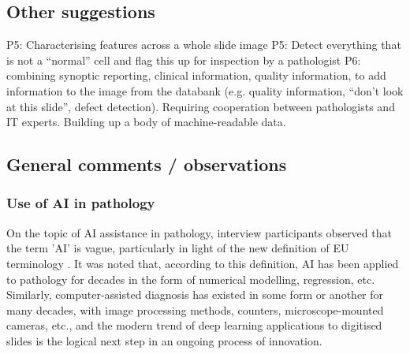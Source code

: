 \subsection{Other suggestions}
P5: Characterising features across a whole slide image
P5: Detect everything that is not a “normal” cell and flag this up for inspection by a pathologist
P6: combining synoptic reporting, clinical information, quality information, to add information to the image from the databank (e.g. quality information, “don’t look at this slide”, defect detection). Requiring cooperation between pathologists and IT experts. Building up a body of machine-readable data.

\subsection{General comments / observations}

\subsubsection{Use of AI in pathology}
On the topic of AI assistance in pathology, interview participants observed that the term 'AI' is vague,  particularly in light of the new definition of EU terminology \cite{ISO_IEC_22989}. It was noted that, according to this definition, AI has been applied to pathology for decades in the form of numerical modelling, regression, etc. Similarly, computer-assisted diagnosis has existed in some form or another for many decades, with image processing methods, counters, microscope-mounted cameras, etc., and the modern trend of deep learning applications to digitised slides is the logical next step in an ongoing process of innovation.

